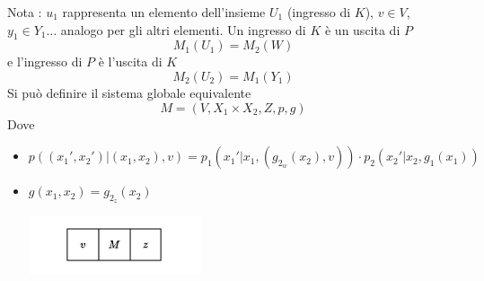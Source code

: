 \documentclass[10pt, letterpaper]{report}
\begin{document}
Nota : $u_1$ rappresenta un elemento dell'insieme $U_1$ (ingresso di $K$), $v\in V$, $y_1\in Y_1\dots$ analogo 
per gli altri elementi.\acc
Un ingresso di $K$ è un uscita di $P$ $$ M_1(U_1)=M_2(W)$$ 
e l'ingresso di $P$ è l'uscita di $K$ $$ M_2(U_2)=M_1(Y_1)$$
Si può definire il sistema globale equivalente 
$$M=(V,X_1\times X_2,Z,p,g) $$
Dove \begin{itemize}
    \item $p((x_1',x_2')|(x_1,x_2),v)=p_1(x_1'|x_1,(g_{2_w}(x_2),v))\cdot p_2(x_2'|x_2,g_1(x_1))$ 
    \item $g(x_1,x_2)=g_{2_z}(x_2)$\begin{center}
        \includegraphics[width=0.4\textwidth ]{images/vmz.pdf}
    \end{center}
\end{itemize}\flowerLine 
\end{document}
